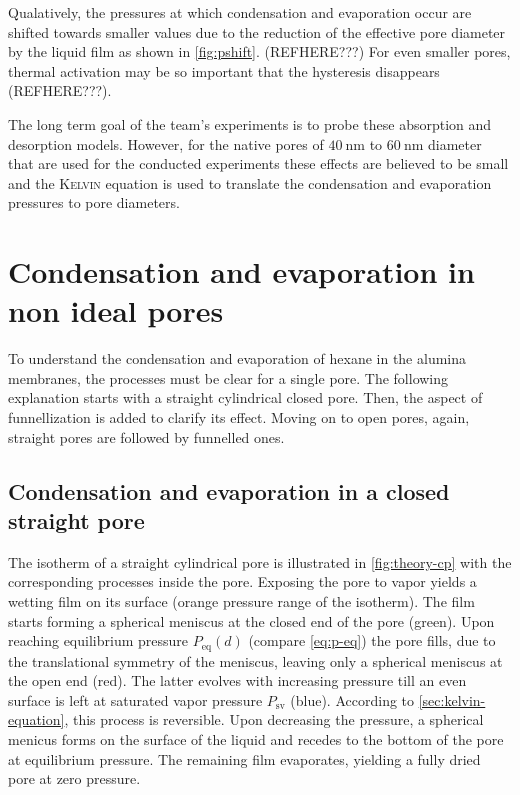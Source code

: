 \documentclass[../thesis.tex]{subfiles}
\begin{document}
      Qualatively, the pressures at which condensation and evaporation occur are shifted towards smaller values due to the reduction of the effective pore diameter by the liquid film as shown in \cref{fig:pshift}. (REFHERE???) For even smaller pores, thermal activation may be so important that the hysteresis disappears (REFHERE???).
      \medskip

      The long term goal of the team's experiments is to probe these absorption and desorption models. However, for the native pores of $\SI{40}{\nano\meter}$ to $\SI{60}{\nano\meter}$ diameter that are used for the conducted experiments these effects are believed to be small and the \textsc{Kelvin} equation is used to translate the condensation and evaporation pressures to pore diameters.


    \section{Condensation and evaporation in non ideal pores}
    \label{eq:cond-evap-non-ideal-pore}

      To understand the condensation and evaporation of hexane in the alumina membranes, the processes must be clear for a single pore. The following explanation starts with a straight cylindrical closed pore. Then, the aspect of funnellization is added to clarify its effect. Moving on to open pores, again, straight pores are followed by funnelled ones.

      \subsection{Condensation and evaporation in a closed straight pore}
      \label{subsec:closed-pore-theory}

        The isotherm of a straight cylindrical pore is illustrated in \cref{fig:theory-cp} with the corresponding processes inside the pore. Exposing the pore to vapor yields a wetting film on its surface (orange pressure range of the isotherm). The film starts forming a spherical meniscus at the closed end of the pore (green). Upon reaching equilibrium pressure $P_\mathrm{eq}(d)$ (compare \cref{eq:p-eq}) the pore fills, due to the translational symmetry of the meniscus, leaving only a spherical meniscus at the open end (red). The latter evolves with increasing pressure till an even surface is left at saturated vapor pressure $P_\mathrm{sv}$ (blue). According to \cref{sec:kelvin-equation}, this process is reversible. Upon decreasing the pressure, a spherical menicus forms on the surface of the liquid and recedes to the bottom of the pore at equilibrium pressure. The remaining film evaporates, yielding a fully dried pore at zero pressure.
\end{document}
